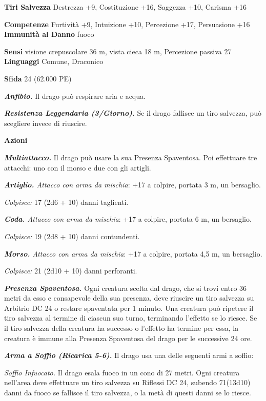 \begin{multicols}{2}
\textbf{Tiri Salvezza} Destrezza +9, Costituzione +16, Saggezza +10,
Carisma +16

\textbf{Competenze} Furtività +9, Intuizione +10, Percezione +17,
Persuasione +16 \textbf{Immunità al Danno} fuoco

\textbf{Sensi} visione crepuscolare 36 m, vista cieca 18 m, Percezione passiva
27 \textbf{Linguaggi} Comune, Draconico

\textbf{Sfida} 24 (62.000 PE)

\emph{\textbf{Anfibio.}} Il drago può respirare aria e acqua.

\emph{\textbf{Resistenza Leggendaria (3/Giorno).}} Se il drago fallisce
un tiro salvezza, può scegliere invece di riuscire.

\textbf{Azioni}

\emph{\textbf{Multiattacco.}} Il drago può usare la sua Presenza
Spaventosa. Poi effettuare tre attacchi: uno con il morso e due con gli
artigli.

\emph{\textbf{Artiglio.} Attacco con arma da mischia}: +17 a colpire,
portata 3 m, un bersaglio.

\emph{Colpisce:} 17 (2d6 + 10) danni taglienti.

\emph{\textbf{Coda.} Attacco con arma da mischia}: +17 a colpire,
portata 6 m, un bersaglio.

\emph{Colpisce:} 19 (2d8 + 10) danni contundenti.

\emph{\textbf{Morso.} Attacco con arma da mischia}: +17 a colpire,
portata 4,5 m, un bersaglio.

\emph{Colpisce:} 21 (2d10 + 10) danni perforanti.

\emph{\textbf{Presenza Spaventosa.}} Ogni creatura scelta dal drago, che
si trovi entro 36 metri da esso e consapevole della sua presenza, deve
riuscire un tiro salvezza su Arbitrio DC 24 o restare spaventata per 1
minuto. Una creatura può ripetere il tiro salvezza al termine di ciascun
suo turno, terminando l'effetto se lo riesce. Se il tiro salvezza della
creatura ha successo o l'effetto ha termine per essa, la creatura è
immune alla Presenza Spaventosa del drago per le successive 24 ore.

\emph{\textbf{Arma a Soffio (Ricarica 5-6).}} Il drago usa una delle
seguenti armi a soffio:

\emph{Soffio Infuocato.} Il drago esala fuoco in un cono di 27 metri.
Ogni creatura nell'area deve effettuare un tiro salvezza su Riflessi DC
24, subendo 71(13d10) danni da fuoco se fallisce il tiro salvezza, o la
metà di questi danni se lo riesce.


\end{multicols}
